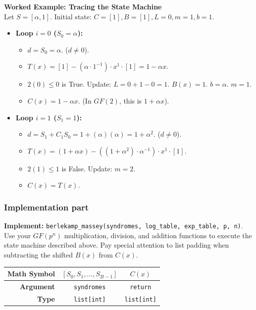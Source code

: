 \documentclass[11pt]{article}
\begin{document}
\textbf{Worked Example: Tracing the State Machine} \\
Let $S = [\alpha, 1]$. Initial state: $C=[1], B=[1], L=0, m=1, b=1$.
\begin{itemize}
    \item \textbf{Loop $i=0$ ($S_0 = \alpha$):}
    \begin{itemize}
        \item $d = S_0 = \alpha$. ($d \neq 0$).
        \item $T(x) = [1] - (\alpha \cdot 1^{-1}) \cdot x^1 \cdot [1] = 1 - \alpha x$.
        \item $2(0) \le 0$ is True. Update: $L = 0 + 1 - 0 = 1$. $B(x) = 1$. $b = \alpha$. $m = 1$.
        \item $C(x) = 1 - \alpha x$. (In $GF(2)$, this is $1 + \alpha x$).
    \end{itemize}
    \item \textbf{Loop $i=1$ ($S_1 = 1$):}
    \begin{itemize}
        \item $d = S_1 + C_1 S_0 = 1 + (\alpha)(\alpha) = 1 + \alpha^2$. ($d \neq 0$).
        \item $T(x) = (1 + \alpha x) - ((1+\alpha^2) \cdot \alpha^{-1}) \cdot x^1 \cdot [1]$.
        \item $2(1) \le 1$ is False. Update: $m = 2$.
        \item $C(x) = T(x)$.
    \end{itemize}
\end{itemize}

\subsubsection*{Implementation part}
\textbf{Implement:} \lstinline|berlekamp_massey(syndromes, log_table, exp_table, p, n)|. Use your $GF(p^n)$ multiplication, division, and addition functions to execute the state machine described above. Pay special attention to list padding when subtracting the shifted $B(x)$ from $C(x)$.

\begin{center}
\renewcommand{\arraystretch}{2.0}
\begin{tabular}{r | c | c }
\toprule
\textbf{Math Symbol} & $[S_0, S_1, \dots, S_{2t-1}]$ & $C(x)$ \\ \midrule
\textbf{Argument} & \lstinline|syndromes| & \lstinline|return| \\ \midrule
\textbf{Type} & \lstinline|list[int]| & \lstinline|list[int]| \\
\bottomrule
\end{tabular}
\end{center}
\end{document}
